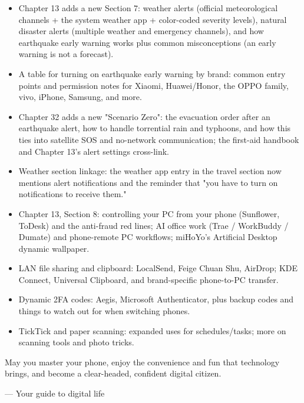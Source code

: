 \begin{itemize}
  \item Chapter 13 adds a new Section 7: weather alerts (official meteorological channels + the system weather app + color-coded severity levels), natural disaster alerts (multiple weather and emergency channels), and how earthquake early warning works plus common misconceptions (an early warning is not a forecast).
  \item A table for turning on earthquake early warning by brand: common entry points and permission notes for Xiaomi, Huawei/Honor, the OPPO family, vivo, iPhone, Samsung, and more.
  \item Chapter 32 adds a new "Scenario Zero": the evacuation order after an earthquake alert, how to handle torrential rain and typhoons, and how this ties into satellite SOS and no-network communication; the first-aid handbook and Chapter 13's alert settings cross-link.
  \item Weather section linkage: the weather app entry in the travel section now mentions alert notifications and the reminder that "you have to turn on notifications to receive them."
\end{itemize}


\begin{itemize}
  \item Chapter 13, Section 8: controlling your PC from your phone (Sunflower, ToDesk) and the anti-fraud red lines; AI office work (Trae / WorkBuddy / Dumate) and phone-remote PC workflows; miHoYo's Artificial Desktop dynamic wallpaper.
  \item LAN file sharing and clipboard: LocalSend, Feige Chuan Shu, AirDrop; KDE Connect, Universal Clipboard, and brand-specific phone-to-PC transfer.
  \item Dynamic 2FA codes: Aegis, Microsoft Authenticator, plus backup codes and things to watch out for when switching phones.
  \item TickTick and paper scanning: expanded uses for schedules/tasks; more on scanning tools and photo tricks.
\end{itemize}

May you master your phone, enjoy the convenience and fun that technology brings, and become a clear-headed, confident digital citizen.

— Your guide to digital life
